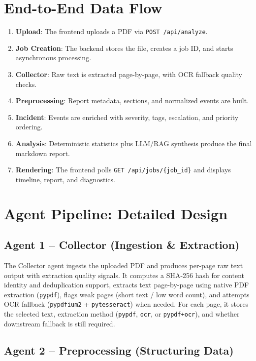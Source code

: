 \documentclass[11pt,a4paper]{article}
\begin{document}
\section{End-to-End Data Flow}

\begin{enumerate}
  \item \textbf{Upload}: The frontend uploads a PDF via \texttt{POST /api/analyze}.
  \item \textbf{Job Creation}: The backend stores the file, creates a job ID, and starts asynchronous processing.
  \item \textbf{Collector}: Raw text is extracted page-by-page, with OCR fallback quality checks.
  \item \textbf{Preprocessing}: Report metadata, sections, and normalized events are built.
  \item \textbf{Incident}: Events are enriched with severity, tags, escalation, and priority ordering.
  \item \textbf{Analysis}: Deterministic statistics plus LLM/RAG synthesis produce the final markdown report.
  \item \textbf{Rendering}: The frontend polls \texttt{GET /api/jobs/\{job\_id\}} and displays timeline, report, and diagnostics.
\end{enumerate}

\section{Agent Pipeline: Detailed Design}

\subsection{Agent 1 -- Collector (Ingestion \& Extraction)}

The Collector agent ingests the uploaded PDF and produces per-page raw text output with extraction quality signals. It computes a SHA-256 hash for content identity and deduplication support, extracts text page-by-page using native PDF extraction (\texttt{pypdf}), flags weak pages (short text / low word count), and attempts OCR fallback (\texttt{pypdfium2} + \texttt{pytesseract}) when needed. For each page, it stores the selected text, extraction method (\texttt{pypdf}, \texttt{ocr}, or \texttt{pypdf+ocr}), and whether downstream fallback is still required.

\subsection{Agent 2 -- Preprocessing (Structuring Data)}
\end{document}
